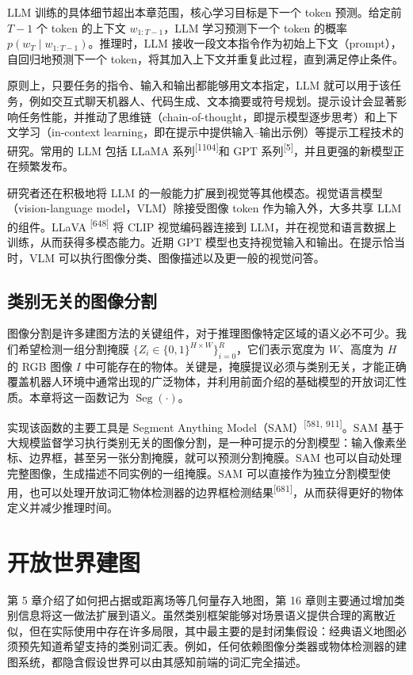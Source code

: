 LLM 训练的具体细节超出本章范围，核心学习目标是下一个 token 预测。给定前 $T-1$ 个 token 的上下文 $w_{1:T-1}$，LLM 学习预测下一个 token 的概率 $p(w_T\mid w_{1:T-1})$。推理时，LLM 接收一段文本指令作为初始上下文（prompt），自回归地预测下一个 token，将其加入上下文并重复此过程，直到满足停止条件。

原则上，只要任务的指令、输入和输出都能够用文本指定，LLM 就可以用于该任务，例如交互式聊天机器人、代码生成、文本摘要或符号规划。提示设计会显著影响任务性能，并推动了思维链（chain-of-thought，即提示模型逐步思考）和上下文学习（in-context learning，即在提示中提供输入--输出示例）等提示工程技术的研究。常用的 LLM 包括 LLaMA 系列\textsuperscript{[1104]}和 GPT 系列\textsuperscript{[5]}，并且更强的新模型正在频繁发布。

研究者还在积极地将 LLM 的一般能力扩展到视觉等其他模态。视觉语言模型（vision-language model，VLM）除接受图像 token 作为输入外，大多共享 LLM 的组件。LLaVA \textsuperscript{[648]} 将 CLIP 视觉编码器连接到 LLM，并在视觉和语言数据上训练，从而获得多模态能力。近期 GPT 模型也支持视觉输入和输出。在提示恰当时，VLM 可以执行图像分类、图像描述以及更一般的视觉问答。

\subsection{类别无关的图像分割}

图像分割是许多建图方法的关键组件，对于推理图像特定区域的语义必不可少。我们希望检测一组分割掩膜 $\{Z_i\in\{0,1\}^{H\times W}\}_{i=0}^{R}$，它们表示宽度为 $W$、高度为 $H$ 的 RGB 图像 $I$ 中可能存在的物体。关键是，掩膜提议必须与类别无关，才能正确覆盖机器人环境中通常出现的广泛物体，并利用前面介绍的基础模型的开放词汇性质。本章将这一函数记为 $\operatorname{Seg}(\cdot)$。

实现该函数的主要工具是 Segment Anything Model（SAM）\textsuperscript{[581, 911]}。SAM 基于大规模监督学习执行类别无关的图像分割，是一种可提示的分割模型：输入像素坐标、边界框，甚至另一张分割掩膜，就可以预测分割掩膜。SAM 也可以自动处理完整图像，生成描述不同实例的一组掩膜。SAM 可以直接作为独立分割模型使用，也可以处理开放词汇物体检测器的边界框检测结果\textsuperscript{[681]}，从而获得更好的物体定义并减少推理时间。

\section{开放世界建图}

第 5 章介绍了如何把占据或距离场等几何量存入地图，第 16 章则主要通过增加类别信息将这一做法扩展到语义。虽然类别框架能够对场景语义提供合理的离散近似，但在实际使用中存在许多局限，其中最主要的是封闭集假设：经典语义地图必须预先知道希望支持的类别词汇表。例如，任何依赖图像分类器或物体检测器的建图系统，都隐含假设世界可以由其感知前端的词汇完全描述。

